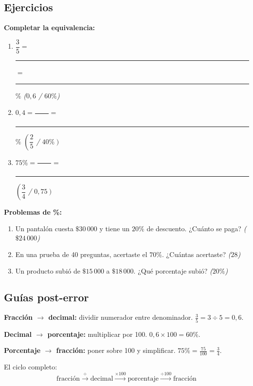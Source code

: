 \documentclass[11pt,a4paper]{article}
\begin{document}
\subsection{Ejercicios}

\textbf{Completar la equivalencia:}
\begin{enumerate}[label=\textbf{\arabic*.},leftmargin=1cm,itemsep=6pt]
  \item $\dfrac{3}{5} = $ \rule{1.5cm}{0.4pt} $= $ \rule{1.5cm}{0.4pt}$\%$ \hfill \textit{($0{,}6$ / $60\%$)}
  \item $0{,}4 = \dfrac{\qquad}{\qquad} = $ \rule{1.5cm}{0.4pt}$\%$ \hfill \textit{$\left(\dfrac{2}{5}\right.$ / $\left.40\%\right)$}
  \item $75\% = \dfrac{\qquad}{\qquad} = $ \rule{1.5cm}{0.4pt} \hfill \textit{$\left(\dfrac{3}{4}\right.$ / $\left.0{,}75\right)$}
\end{enumerate}

\medskip
\textbf{Problemas de \%:}
\begin{enumerate}[label=\textbf{\arabic*.},leftmargin=1cm,itemsep=6pt,start=4]
  \item Un pantalón cuesta $\$30\,000$ y tiene un $20\%$ de descuento. ¿Cuánto se paga? \hfill \textit{($\$24\,000$)}
  \item En una prueba de 40 preguntas, acertaste el $70\%$. ¿Cuántas acertaste? \hfill \textit{($28$)}
  \item Un producto subió de $\$15\,000$ a $\$18\,000$. ¿Qué porcentaje subió? \hfill \textit{($20\%$)}
\end{enumerate}

\subsection{Guías post-error}

\begin{tcolorbox}[guia-tutor, title={\color{tutormorado} CÓMO CONVERTIR ENTRE LAS TRES FORMAS}]
\textbf{Fracción $\to$ decimal:} dividir numerador entre denominador. $\frac{3}{5} = 3 \div 5 = 0{,}6$.

\textbf{Decimal $\to$ porcentaje:} multiplicar por 100. $0{,}6 \times 100 = 60\%$.

\textbf{Porcentaje $\to$ fracción:} poner sobre 100 y simplificar. $75\% = \frac{75}{100} = \frac{3}{4}$.

El ciclo completo:
\[
  \text{fracción} \xrightarrow{\div} \text{decimal} \xrightarrow{\times 100} \text{porcentaje} \xrightarrow{\div 100} \text{fracción}
\]
\end{tcolorbox}
\end{document}
